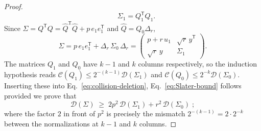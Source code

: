 \documentclass[prx,twocolumn,superscriptaddress,aps,10pt, frontmatterverbose, reprint,footinbib,longbibliography=true]{revtex4-2}
\newcommand{\trans}{\mathsf{T}}
\begin{document}
\begin{proof}
\begin{equation}
    \quad \Sigma_1=Q_1^{\trans}Q_1 .\end{equation}
Since $\Sigma=Q^{\trans}Q=\widehat Q^{\trans}\widehat Q+p\,e_1e_1^{\trans}$ and $\widehat Q=Q_0\Delta_r$,
\begin{equation}\Sigma=p\,e_1e_1^{\trans}+\Delta_r\,\Sigma_0\,\Delta_r
    =\begin{pmatrix} p+r\,u_1 & \sqrt r\,y^{\trans}\\[2pt] \sqrt r\,y & \Sigma_1\end{pmatrix}.
    \label{eq:S-deletion}
\end{equation} 
The matrices $Q_1$ and $Q_0$ have $k-1$ and $k$ columns respectively, so the induction hypothesis reads $\mathcal{C}(Q_1)\le 2^{-(k-1)}\mathcal{D}(\Sigma_1)$ and $\mathcal{C}(Q_0)\le 2^{-k}\mathcal{D}(\Sigma_0)$. Inserting these into Eq.~\eqref{eq:collision-deletion}, Eq.~\eqref{eq:Slater-bound} follows provided we prove that
\begin{equation}
    \mathcal{D}(\Sigma)\;\ge\;2p^2\,\mathcal{D}(\Sigma_1)+r^2\,\mathcal{D}(\Sigma_0)\;;
    \label{eq:determinant-deletion}
\end{equation}
where the factor $2$ in front of $p^2$ is precisely the mismatch $2^{-(k-1)}=2\cdot 2^{-k}$ between the normalizations at $k-1$ and $k$ columns.


\end{proof}
\end{document}
